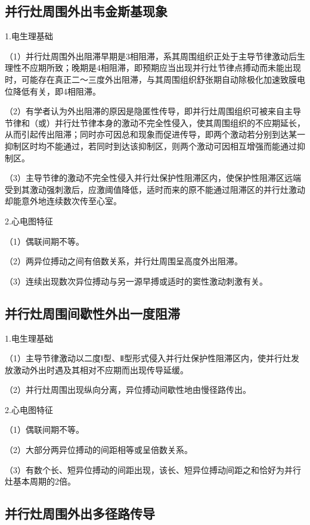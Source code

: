 \subsection{并行灶周围外出韦金斯基现象}

1.电生理基础

（1）并行灶周围外出阻滞早期是3相阻滞，系其周围组织正处于主导节律激动后生理性不应期所致；晚期是4相阻滞，即预期应当出现并行灶节律点搏动而未能出现时，可能存在真正二～三度外出阻滞，与其周围组织舒张期自动除极化加速致膜电位降低有关，即4相阻滞。

（2）有学者认为外出阻滞的原因是隐匿性传导，即并行灶周围组织可被来自主导节律和（或）并行灶节律本身的激动不完全性侵入，使其周围组织的不应期延长，从而引起传出阻滞；同时亦可因总和现象而促进传导，即两个激动若分别到达某一抑制区时均不能通过，若同时到达该抑制区，则两个激动可因相互增强而能通过抑制区。

（3）主导节律的激动不完全性侵入并行灶保护性阻滞区内，使保护性阻滞区远端受到其激动强刺激后，应激阈值降低，适时而来的原不能通过阻滞区的并行灶激动却能意外地连续数次传至心室。

2.心电图特征

（1）偶联间期不等。

（2）两异位搏动之间有倍数关系，并行灶周围呈高度外出阻滞。

（3）连续出现数次异位搏动与另一源早搏或适时的窦性激动刺激有关。

\protect\hypertarget{text00023.htmlux5cux23subid296}{}{}

\subsection{并行灶周围间歇性外出一度阻滞}

1.电生理基础

（1）主导节律激动以二度Ⅰ型、Ⅱ型形式侵入并行灶保护性阻滞区内，使并行灶发放激动外出时遇及其相对不应期而出现传导延缓。

（2）并行灶周围出现纵向分离，异位搏动间歇性地由慢径路传出。

2.心电图特征

（1）偶联间期不等。

（2）大部分两异位搏动的间距相等或呈倍数关系。

（3）有数个长、短异位搏动的间距出现，该长、短异位搏动间距之和恰好为并行灶基本周期的2倍。

\protect\hypertarget{text00023.htmlux5cux23subid297}{}{}

\subsection{并行灶周围外出多径路传导}

